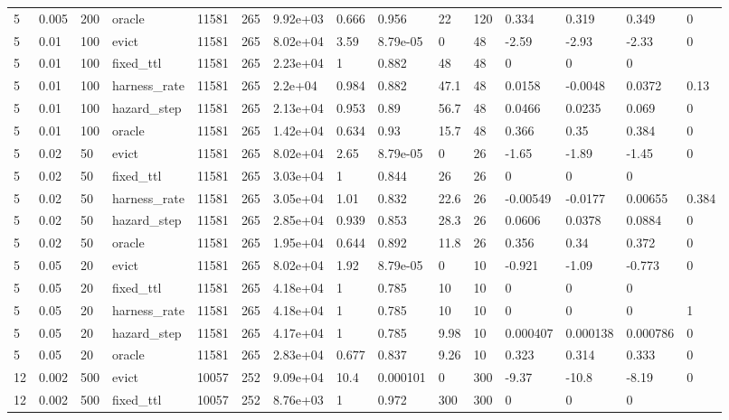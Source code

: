 \begin{tabular}{lllllllllllllll}
5 & 0.005 & 200 & oracle & 11581 & 265 & 9.92e+03 & 0.666 & 0.956 & 22 & 120 & 0.334 & 0.319 & 0.349 & 0 \\
5 & 0.01 & 100 & evict & 11581 & 265 & 8.02e+04 & 3.59 & 8.79e-05 & 0 & 48 & -2.59 & -2.93 & -2.33 & 0 \\
5 & 0.01 & 100 & fixed\_ttl & 11581 & 265 & 2.23e+04 & 1 & 0.882 & 48 & 48 & 0 & 0 & 0 &  \\
5 & 0.01 & 100 & harness\_rate & 11581 & 265 & 2.2e+04 & 0.984 & 0.882 & 47.1 & 48 & 0.0158 & -0.0048 & 0.0372 & 0.13 \\
5 & 0.01 & 100 & hazard\_step & 11581 & 265 & 2.13e+04 & 0.953 & 0.89 & 56.7 & 48 & 0.0466 & 0.0235 & 0.069 & 0 \\
5 & 0.01 & 100 & oracle & 11581 & 265 & 1.42e+04 & 0.634 & 0.93 & 15.7 & 48 & 0.366 & 0.35 & 0.384 & 0 \\
5 & 0.02 & 50 & evict & 11581 & 265 & 8.02e+04 & 2.65 & 8.79e-05 & 0 & 26 & -1.65 & -1.89 & -1.45 & 0 \\
5 & 0.02 & 50 & fixed\_ttl & 11581 & 265 & 3.03e+04 & 1 & 0.844 & 26 & 26 & 0 & 0 & 0 &  \\
5 & 0.02 & 50 & harness\_rate & 11581 & 265 & 3.05e+04 & 1.01 & 0.832 & 22.6 & 26 & -0.00549 & -0.0177 & 0.00655 & 0.384 \\
5 & 0.02 & 50 & hazard\_step & 11581 & 265 & 2.85e+04 & 0.939 & 0.853 & 28.3 & 26 & 0.0606 & 0.0378 & 0.0884 & 0 \\
5 & 0.02 & 50 & oracle & 11581 & 265 & 1.95e+04 & 0.644 & 0.892 & 11.8 & 26 & 0.356 & 0.34 & 0.372 & 0 \\
5 & 0.05 & 20 & evict & 11581 & 265 & 8.02e+04 & 1.92 & 8.79e-05 & 0 & 10 & -0.921 & -1.09 & -0.773 & 0 \\
5 & 0.05 & 20 & fixed\_ttl & 11581 & 265 & 4.18e+04 & 1 & 0.785 & 10 & 10 & 0 & 0 & 0 &  \\
5 & 0.05 & 20 & harness\_rate & 11581 & 265 & 4.18e+04 & 1 & 0.785 & 10 & 10 & 0 & 0 & 0 & 1 \\
5 & 0.05 & 20 & hazard\_step & 11581 & 265 & 4.17e+04 & 1 & 0.785 & 9.98 & 10 & 0.000407 & 0.000138 & 0.000786 & 0 \\
5 & 0.05 & 20 & oracle & 11581 & 265 & 2.83e+04 & 0.677 & 0.837 & 9.26 & 10 & 0.323 & 0.314 & 0.333 & 0 \\
12 & 0.002 & 500 & evict & 10057 & 252 & 9.09e+04 & 10.4 & 0.000101 & 0 & 300 & -9.37 & -10.8 & -8.19 & 0 \\
12 & 0.002 & 500 & fixed\_ttl & 10057 & 252 & 8.76e+03 & 1 & 0.972 & 300 & 300 & 0 & 0 & 0 &  \\

\end{tabular}
